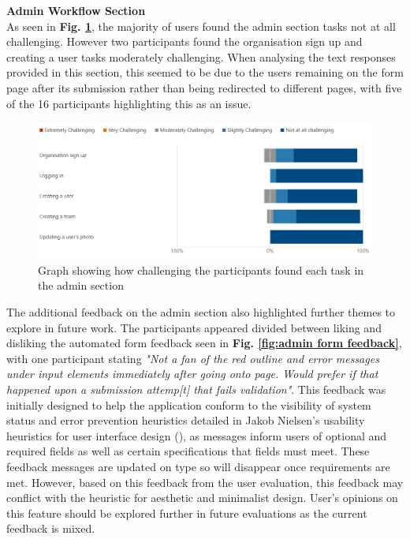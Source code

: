 \documentclass[l4proj.tex]{subfiles}
\begin{document}
\textbf{Admin Workflow Section}\\
As seen in \textbf{Fig. \ref{fig:admin task graph}}, the majority of users found the admin section tasks not at all challenging. However two participants found the organisation sign up and creating a user tasks moderately challenging. When analysing the text responses provided in this section, this seemed to be due to the users remaining on the form page after its submission rather than being redirected to different pages, with five of the 16 participants highlighting this as an issue.

\begin{figure}[h!]
\begin{center}
\includegraphics[scale=0.5]{dissertation/images/EvaluationAdminChallengingGraph.png}
\caption{Graph showing how challenging the participants found each task in the admin section}
\label{fig:admin task graph} 
\end{center}
\end{figure}

The additional feedback on the admin section also highlighted further themes to explore in future work. The participants appeared divided between liking and disliking the automated form feedback seen in \textbf{Fig. \ref{fig:admin form feedback}}, with one participant stating \textit{"Not a fan of the red outline and error messages under input elements immediately after going onto page. Would prefer if that happened upon a submission attemp[t] that fails validation"}. This feedback was initially designed to help the application conform to the visibility of system status and error prevention heuristics detailed in Jakob Nielsen's usability heuristics for user interface design (\cite{NeilsenHeuristics}), as messages inform users of optional and required fields as well as certain specifications that fields must meet. These feedback messages are updated on type so will disappear once requirements are met. However, based on this feedback from the user evaluation, this feedback may conflict with the heuristic for aesthetic and minimalist design. User's opinions on this feature should be explored further in future evaluations as the current feedback is mixed.
\end{document}
